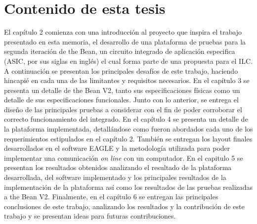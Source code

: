  




\section{Contenido de esta tesis}
El capítulo 2 comienza con una introducción al proyecto que inspira el trabajo presentado en esta memoria, el desarrollo de una plataforma de pruebas para la segunda iteración de the Bean, un circuito integrado de aplicación especifica (ASIC, por sus siglas en inglés) el cual forma parte de una propuesta para el ILC. A continuación se presentan los principales desafíos de este trabajo, haciendo hincapié en cada una de las limitantes y requisitos necesarios. En el capítulo 3 se presenta un detalle de the Bean V2, tanto sus especificaciones físicas como un detalle de sus especificaciones funcionales. Junto con lo anterior, se entrega el diseño de las principales pruebas a considerar con el fin de poder corroborar el correcto funcionamiento del integrado. En el capítulo 4 se presenta un detalle de la plataforma implementada, detallándose como fueron abordados cada uno de los requerimientos estipulados en el capítulo 2. También se entregan los layout finales desarrollados en el software EAGLE y la metodología utilizada para poder implementar una comunicación \textit{on line} con un computador. En el capitulo 5 se presentan los resultados obtenidos analizando el resultado de la plataforma desarrollada, del software implementado y los principales resultados de la implementación de la plataforma así como los resultados de las pruebas realizadas a the Bean V2. Finalmente, en el capítulo 6 se entregan las principales conclusiones de este trabajo, analizando los resultados y la contribución de este trabajo y se presentan ideas para futuras contribuciones.  